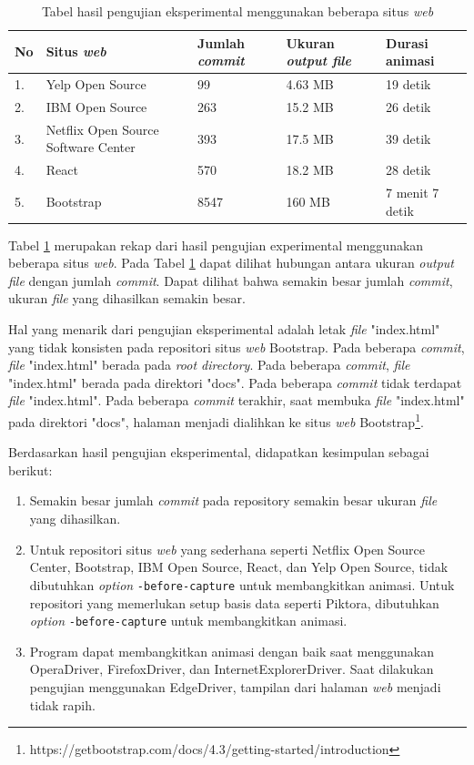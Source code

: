 \begin{table}[htbp]
	\centering
	\caption{Tabel hasil pengujian eksperimental menggunakan beberapa situs \textit{web}}
	
		\begin{tabular}{|p{0.3cm}| p{5 cm}| p{3 cm }|p{3 cm}| p{3 cm}|} \hline
		No & Situs \textit{web}	& Jumlah \textit{commit} &Ukuran \textit{output file}  & Durasi animasi \\ \hline
		1. & Yelp Open Source & 99 &4.63 MB  & 19 detik\\ \hline
		2. & IBM Open Source & 263&15.2 MB  & 26 detik	\\ \hline	
		3. & Netflix Open Source Software Center & 393 &17.5 MB & 39 detik  \\ \hline
		4. & React & 570 & 18.2 MB  & 28 detik \\ \hline
		5. & Bootstrap & 8547 &160 MB & 7 menit 7 detik  \\ \hline
		\end{tabular}
	\label{table:hasil_eksperimental}
\end{table}

Tabel \ref{table:hasil_eksperimental} merupakan rekap dari hasil pengujian experimental menggunakan beberapa situs \textit{web}. Pada Tabel \ref{table:hasil_eksperimental} dapat dilihat hubungan antara ukuran \textit{output file} dengan jumlah \textit{commit}. Dapat dilihat bahwa semakin besar jumlah \textit{commit}, ukuran \textit{file} yang dihasilkan semakin besar.

Hal yang menarik dari pengujian eksperimental adalah letak \textit{file} "index.html" yang tidak konsisten pada repositori situs \textit{web} Bootstrap. Pada beberapa \textit{commit}, \textit{file} "index.html" berada pada \textit{root directory}. Pada beberapa \textit{commit}, \textit{file} "index.html" berada pada direktori "docs". Pada beberapa \textit{commit} tidak terdapat \textit{file} "index.html". Pada beberapa \textit{commit} terakhir, saat membuka \textit{file} "index.html" pada direktori "docs", halaman menjadi dialihkan ke situs \textit{web} Bootstrap\footnote{https://getbootstrap.com/docs/4.3/getting-started/introduction}.


Berdasarkan hasil pengujian eksperimental, didapatkan kesimpulan sebagai berikut:
\begin{enumerate}
\item Semakin besar jumlah \textit{commit} pada repository semakin besar ukuran \textit{file} yang dihasilkan.
\item Untuk repositori situs \textit{web} yang sederhana seperti Netflix Open Source Center, Bootstrap, IBM Open Source, React, dan Yelp Open Source, tidak dibutuhkan \textit{option} \texttt{-before-capture} untuk membangkitkan animasi. Untuk repositori yang memerlukan setup basis data seperti Piktora, dibutuhkan \textit{option} \texttt{-before-capture} untuk membangkitkan animasi. 
\item Program dapat membangkitkan animasi dengan baik saat menggunakan OperaDriver, FirefoxDriver, dan InternetExplorerDriver. Saat dilakukan pengujian menggunakan EdgeDriver, tampilan dari halaman \textit{web} menjadi tidak rapih.
\end{enumerate}

